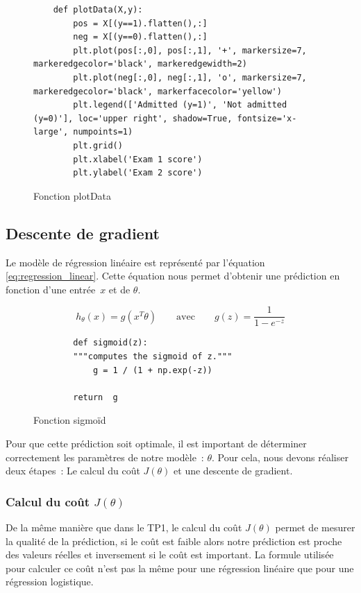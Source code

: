 \begin{figure}[!h]
    \begin{verbatim}
    def plotData(X,y):
	    pos = X[(y==1).flatten(),:]
	    neg = X[(y==0).flatten(),:]
	    plt.plot(pos[:,0], pos[:,1], '+', markersize=7, markeredgecolor='black', markeredgewidth=2) 
	    plt.plot(neg[:,0], neg[:,1], 'o', markersize=7, markeredgecolor='black', markerfacecolor='yellow') 
	    plt.legend(['Admitted (y=1)', 'Not admitted (y=0)'], loc='upper right', shadow=True, fontsize='x-large', numpoints=1) 
	    plt.grid()
	    plt.xlabel('Exam 1 score')
	    plt.ylabel('Exam 2 score')
    \end{verbatim}   
    \caption{Fonction plotData}
    \end{figure}

    \subsection{Descente de gradient}

    Le modèle de régression linéaire est représenté par l'équation \ref{eq:regression_linear}. Cette équation nous permet d'obtenir une prédiction en fonction d'une entrée~$x$ et de $\theta$.
    
    \begin{equation}\label{eq:regression_linear}
        h_\theta(x) = g (x^T \theta ) \qquad \text{avec} \qquad g(z)=\frac{1}{1-e^{-z}} 
    \end{equation}

    \begin{figure}[!h]
        \begin{verbatim}
        def sigmoid(z):
        """computes the sigmoid of z."""
            g = 1 / (1 + np.exp(-z))

        return  g
        \end{verbatim}   
        \caption{Fonction sigmoïd}
        \end{figure}
    
    \noindent
    Pour que cette prédiction soit optimale, il est important de déterminer correctement les paramètres de notre modèle~: $\theta$. Pour cela, nous devons réaliser deux étapes~: Le calcul du coût $J(\theta)$ et une descente de gradient.

    \subsubsection{Calcul du coût $J(\theta)$}
    De la même manière que dans le TP1, le calcul du coût $J(\theta)$ permet de mesurer la qualité de la prédiction, si le coût est faible alors notre prédiction est proche des valeurs réelles et inversement si le coût est important. La formule utilisée pour calculer ce coût n'est pas la même pour une régression linéaire que pour une régression logistique. 
    
